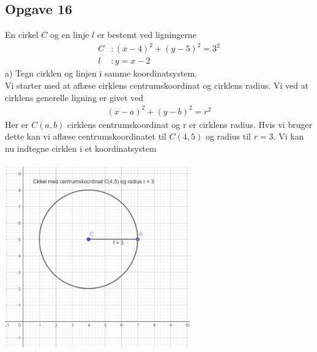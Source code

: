 \subsection{Opgave 16}

En cirkel $C$ og en linje $l$ er bestemt ved ligningerne
\begin{align*}
    C&:(x-4)^2 + (y-5)^2 = 3^2\\
    l&:y = x-2
\end{align*}
 a) Tegn cirklen og linjen i samme koordinatsystem.\\

 \ans
 Vi starter med at aflæse cirklens centrumskoordinat og cirklens radius. Vi ved at cirklens generelle ligning er givet ved
 \begin{align*}
     (x-a)^2 + (y-b)^2 = r^2
 \end{align*}
 Her er $C(a,b)$ cirklens centrumskoordinat og r er cirklens radius. Hvis vi bruger dette kan vi aflæse centrumskoordinatet til $C(4,5)$ og radius til $r = 3$. Vi kan nu indtegne cirklen i et koordinatsystem\\\\
 \includegraphics[width=8cm]{Opgave_11-20/Opgave_16/16.jpg}\\\\
 
